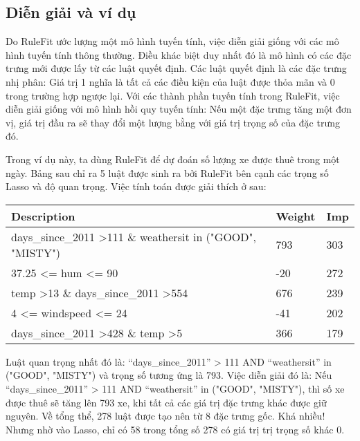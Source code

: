 \subsection{Diễn giải và ví dụ}

Do RuleFit ước lượng một mô hình tuyến tính, việc diễn giải giống với các mô hình tuyến tính thông thường. Điều khác biệt duy nhất đó là mô hình có các đặc trưng mới được lấy từ các luật quyết định. Các luật quyết định là các đặc trưng nhị phân: Giá trị 1 nghĩa là tất cả các điều kiện của luật được thỏa mãn và 0 trong trường hợp ngược lại. Với các thành phần tuyến tính trong RuleFit, việc diễn giải giống với mô hình hồi quy tuyến tính: Nếu một đặc trưng tăng một đơn vị, giá trị đầu ra sẽ thay đổi một lượng bằng với giá trị trọng số của đặc trưng đó.

Trong ví dụ này, ta dùng RuleFit để dự đoán số lượng xe được thuê trong một ngày. Bảng sau chỉ ra 5 luật được sinh ra bởi RuleFit bên cạnh các trọng số Lasso và độ quan trọng. Việc tính toán được giải thích ở sau:

\begin{table*}[hbt!]
\centering
\begin{tabular}{|l|l|l|}
\hline
\textbf{Description}                                                  & \textbf{Weight} & \textbf{Imp} \\ \hline
days\_since\_2011 \textgreater 111 \& weathersit in ("GOOD", "MISTY") & 793             & 303                 \\ \hline
37.25 \textless{}= hum \textless{}= 90                                & -20             & 272                 \\ \hline
temp \textgreater 13 \& days\_since\_2011 \textgreater 554            & 676             & 239                 \\ \hline
4 \textless{}= windspeed \textless{}= 24                              & -41             & 202                 \\ \hline
days\_since\_2011 \textgreater 428 \& temp \textgreater 5             & 366             & 179                 \\ \hline
\end{tabular}
\end{table*}

Luật quan trọng nhất đó là: ``days\_since\_2011'' > 111 AND ``weathersit'' in ("GOOD", "MISTY") và trọng số tương ứng là 793. Việc diễn giải đó là: Nếu ``days\_since\_2011'' > 111 AND ``weathersit'' in ("GOOD", "MISTY"), thì số xe được thuê sẽ tăng lên 793 xe, khi tất cả các giá trị đặc trưng khác được giữ nguyên. Về tổng thể, 278 luật được tạo nên từ 8 đặc trưng gốc. Khá nhiều! Nhưng nhờ vào Lasso, chỉ có 58 trong tổng số 278 có giá trị trị trọng số khác 0.

